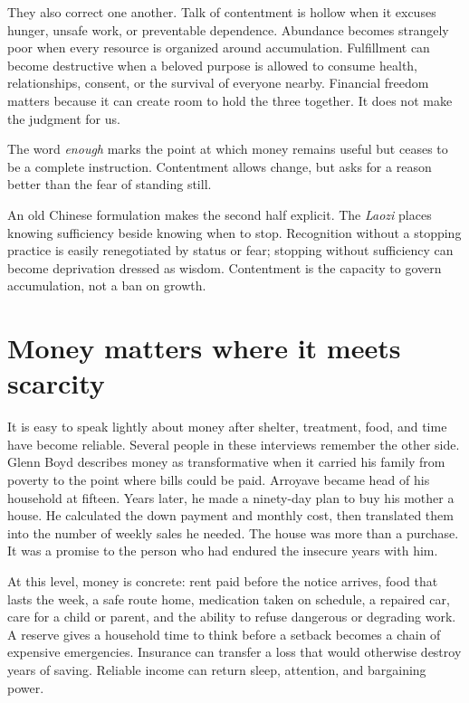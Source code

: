 They also correct one another. Talk of contentment is hollow when it excuses
hunger, unsafe work, or preventable dependence. Abundance becomes strangely
poor when every resource is organized around accumulation. Fulfillment can
become destructive when a beloved purpose is allowed to consume health,
relationships, consent, or the survival of everyone nearby. Financial freedom
matters because it can create room to hold the three together. It does not make
the judgment for us.

The word \emph{enough} marks the point at which money remains useful but ceases
to be a complete instruction. Contentment allows change, but asks for a reason
better than the fear of standing still.

An old Chinese formulation makes the second half explicit. The \emph{Laozi}
places knowing sufficiency beside knowing when to stop. Recognition without a
stopping practice is easily renegotiated by status or fear; stopping without
sufficiency can become deprivation dressed as wisdom. Contentment is the
capacity to govern accumulation, not a ban on growth.

\section{Money matters where it meets scarcity}

It is easy to speak lightly about money after shelter, treatment, food, and
time have become reliable. Several people in these interviews remember the
other side. Glenn Boyd describes money as transformative when it carried his
family from poverty to the point where bills could be paid. Arroyave became
head of his household at fifteen. Years later, he made a ninety-day plan to
buy his mother a house. He calculated the down payment and monthly cost, then
translated them into the number of weekly sales he needed. The house was more
than a purchase. It was a promise to the person who had endured the insecure
years with him.

At this level, money is concrete: rent paid before the notice arrives, food
that lasts the week, a safe route home, medication taken
on schedule, a repaired car, care for a child or parent, and the ability to
refuse dangerous or degrading work. A reserve gives a household time to think
before a setback becomes a chain of expensive emergencies. Insurance can
transfer a loss that would otherwise destroy years of saving. Reliable income
can return sleep, attention, and bargaining power.


